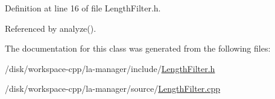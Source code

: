 Definition at line 16 of file LengthFilter.h.

Referenced by analyze().

The documentation for this class was generated from the following files:\begin{CompactItemize}
\item 
/disk/workspace-cpp/la-manager/include/\hyperlink{LengthFilter_8h}{LengthFilter.h}\item 
/disk/workspace-cpp/la-manager/source/\hyperlink{LengthFilter_8cpp}{LengthFilter.cpp}\end{CompactItemize}
